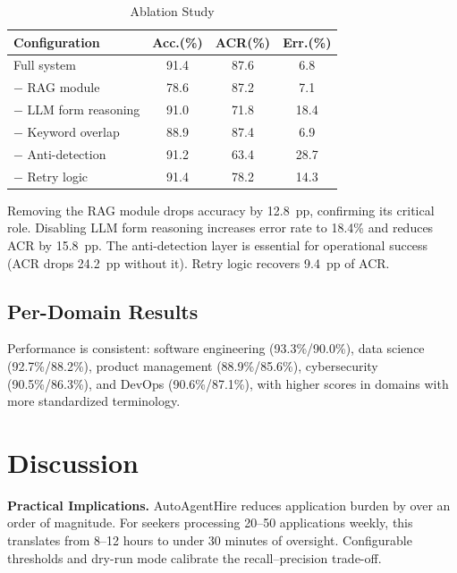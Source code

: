 \documentclass[conference]{IEEEtran}
\begin{document}
\begin{table}[htbp]
\caption{Ablation Study}
\label{tab:ablation}
\centering
\begin{tabular}{@{}l c c c@{}}
\toprule
\textbf{Configuration} & \textbf{Acc.(\%)} & \textbf{ACR(\%)} & \textbf{Err.(\%)} \\
\midrule
Full system                      & 91.4 & 87.6 & 6.8  \\
$-$ RAG module                   & 78.6 & 87.2 & 7.1  \\
$-$ LLM form reasoning           & 91.0 & 71.8 & 18.4 \\
$-$ Keyword overlap              & 88.9 & 87.4 & 6.9  \\
$-$ Anti-detection               & 91.2 & 63.4 & 28.7 \\
$-$ Retry logic                  & 91.4 & 78.2 & 14.3 \\
\bottomrule
\end{tabular}
\end{table}

Removing the RAG module drops accuracy by 12.8~pp, confirming its critical role. Disabling LLM form reasoning increases error rate to 18.4\% and reduces ACR by 15.8~pp. The anti-detection layer is essential for operational success (ACR drops 24.2~pp without it). Retry logic recovers 9.4~pp of ACR.

\subsection{Per-Domain Results}
Performance is consistent: software engineering (93.3\%/90.0\%), data science (92.7\%/88.2\%), product management (88.9\%/85.6\%), cybersecurity (90.5\%/86.3\%), and DevOps (90.6\%/87.1\%), with higher scores in domains with more standardized terminology.

\section{Discussion}

\textbf{Practical Implications.} AutoAgentHire reduces application burden by over an order of magnitude. For seekers processing 20--50 applications weekly, this translates from 8--12 hours to under 30 minutes of oversight. Configurable thresholds and dry-run mode calibrate the recall--precision trade-off.
\end{document}
